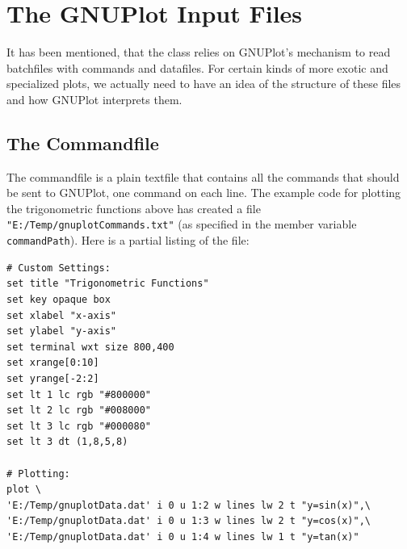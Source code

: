 \documentclass[11pt]{article}
\begin{document}

\section{The GNUPlot Input Files}
It has been mentioned, that the class relies on GNUPlot's mechanism to read batchfiles with commands and datafiles. For certain kinds of more exotic and specialized plots, we actually need to have an idea of the structure of these files and how GNUPlot interprets them.

\subsection{The Commandfile}
The commandfile is a plain textfile that contains all the commands that should be sent to GNUPlot, one command on each line. The example code for plotting the trigonometric functions above has created a file \texttt{"E:/Temp/gnuplotCommands.txt"} (as specified in the member variable \texttt{commandPath}). Here is a partial listing of the file:
\begin{verbatim}
# Custom Settings:
set title "Trigonometric Functions"
set key opaque box
set xlabel "x-axis"
set ylabel "y-axis"
set terminal wxt size 800,400
set xrange[0:10]
set yrange[-2:2]
set lt 1 lc rgb "#800000"
set lt 2 lc rgb "#008000"
set lt 3 lc rgb "#000080"
set lt 3 dt (1,8,5,8)

# Plotting:
plot \
'E:/Temp/gnuplotData.dat' i 0 u 1:2 w lines lw 2 t "y=sin(x)",\
'E:/Temp/gnuplotData.dat' i 0 u 1:3 w lines lw 2 t "y=cos(x)",\
'E:/Temp/gnuplotData.dat' i 0 u 1:4 w lines lw 1 t "y=tan(x)"
\end{verbatim}
\end{document}
